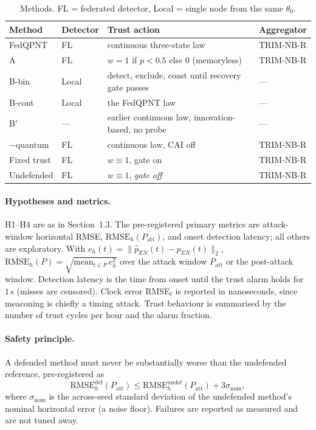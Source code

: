 \documentclass[12pt,a4paper]{article}
\begin{document}
\begin{table}[ht]
\centering
\caption{Methods. FL = federated detector, Local = single node from the same $\theta_0$.}
\label{tab:methods}
\footnotesize
\begin{tabular}{p{2.3cm}p{1.2cm}p{7.0cm}p{2.2cm}}
\toprule
Method & Detector & Trust action & Aggregator \\
\midrule
FedQPNT & FL & continuous three-state law & TRIM-NB-R \\
A \cite{khan2025enhancing,chai2025navigation} & FL & $w{=}1$ if $p{<}0.5$ else $0$ (memoryless) & TRIM-NB-R \\
B-bin \cite{pardhasaradhi2022gps} & Local & detect, exclude, coast until recovery gate passes & --- \\
B-cont \cite{ren2020adaptive} & Local & the FedQPNT law & --- \\
B$'$ \cite{mehra1970identification} & --- & earlier continuous law, innovation-based, no probe & --- \\
$-$quantum & FL & continuous law, CAI off & TRIM-NB-R \\
Fixed trust & FL & $w\equiv1$, gate on & TRIM-NB-R \\
Undefended & FL & $w\equiv1$, \emph{gate off} & TRIM-NB-R \\
\bottomrule
\end{tabular}
\end{table}

\paragraph{Hypotheses and metrics.}
\label{sec:hypotheses}
H1--H4 are as in Section~1.3. The pre-registered primary metrics are attack-window horizontal RMSE, $\mathrm{RMSE}_h(P_{\mathrm{att}})$, and onset detection latency; all others are exploratory. With $e_h(t)=\lVert\hat p_{EN}(t)-p_{EN}(t)\rVert_2$, $\mathrm{RMSE}_h(P)=\sqrt{\mathrm{mean}_{t\in P}\,e_h^2}$ over the attack window $P_{\mathrm{att}}$ or the post-attack window. Detection latency is the time from onset until the trust alarm holds for $1\,\mathrm{s}$ (misses are censored). Clock error RMSE$_t$ is reported in nanoseconds, since meaconing is chiefly a timing attack. Trust behaviour is summarised by the number of trust cycles per hour and the alarm fraction.

\paragraph{Safety principle.}
\label{sec:safety}
A defended method must never be substantially worse than the undefended reference, pre-registered as
\begin{equation}
\mathrm{RMSE}_h^{\mathrm{def}}(P_{\mathrm{att}}) \le \mathrm{RMSE}_h^{\mathrm{undef}}(P_{\mathrm{att}}) + 3\sigma_{\mathrm{nom}},
\label{eq:safety}
\end{equation}
where $\sigma_{\mathrm{nom}}$ is the across-seed standard deviation of the undefended method's nominal horizontal error (a noise floor). Failures are reported as measured and are not tuned away.
\end{document}

